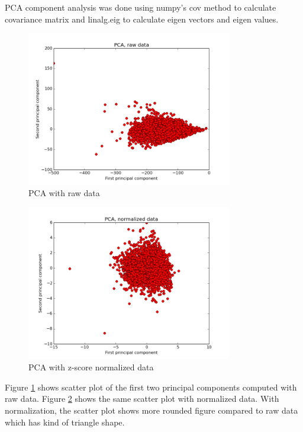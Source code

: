 \documentclass[12pt]{article}
\begin{document}
PCA component analysis was done using numpy's cov method to calculate covariance matrix and linalg.eig to calculate eigen vectors and eigen values.

\begin{figure}[H]
    \centering
    \includegraphics[width=0.8\textwidth]{pca_raw}
    \caption{PCA with raw data}
    \label{fig:pca_raw}
\end{figure}

\begin{figure}[H]
    \centering
    \includegraphics[width=0.8\textwidth]{pca_normalized}
    \caption{PCA with z-score normalized data}
    \label{fig:pca_normalized}
\end{figure}

Figure \ref{fig:pca_raw} shows scatter plot of the first two principal components computed with raw data. Figure \ref{fig:pca_normalized} shows the same scatter plot with normalized data. With normalization, the scatter plot shows more rounded figure compared to raw data which has kind of triangle shape.
\end{document}
